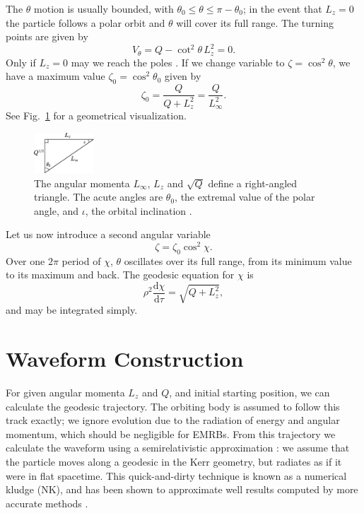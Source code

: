\documentclass[useAMS,usedcolumn,usegraphicx,usenatbib]{mn2e}
\newcommand{\figref}[1]{Fig.~\ref{fig:#1}}
\newcommand{\dd}{\ensuremath{\mathrm{d}}}
\newcommand{\diff}[2]{\ensuremath{\frac{\dd {#1}}{\dd {#2}}}}
\begin{document}
The $\theta$ motion is usually bounded, with $\theta_0 \leq \theta \leq \pi - \theta_0$; in the event that $L_z = 0$ the particle follows a polar orbit and $\theta$ will cover its full range. The turning points are given by
\begin{equation}
V_\theta = Q - \cot^2\theta\, L_z^2 = 0.
\end{equation}
Only if $L_z = 0$ may we reach the poles \citep{Wilkins1972}. If we change variable to $\zeta = \cos^2\theta$, we have a maximum value $\zeta_0 = \cos^2\theta_0$ given by
\begin{equation}
\zeta_0 = \frac{Q}{Q+L_z^2} = \frac{Q}{L_\infty^2}.
\label{eq:theta_0}
\end{equation}
See \figref{L_triangle} for a geometrical visualization.
\begin{figure}
\begin{center}
\includegraphics[width=0.2\textwidth]{Triangle.eps}
    \caption{The angular momenta $L_\infty$, $L_z$ and $\sqrt{Q}$ define a right-angled triangle. The acute angles are $\theta_0$, the extremal value of the polar angle, and $\iota$, the orbital inclination \citep*{Glampedakis2002}.}
   \label{fig:L_triangle}
\end{center}
\end{figure}
Let us now introduce a second angular variable \citep{Drasco2004}
\begin{equation}
\zeta = \zeta_0\cos^2\chi.
\end{equation}
Over one $2\pi$ period of $\chi$, $\theta$ oscillates over its full range, from its minimum value to its maximum and back. The geodesic equation for $\chi$ is
\begin{equation}
\rho^2\diff{\chi}{\tau} = \sqrt{Q + L_z^2},
\end{equation}
and may be integrated simply.

\section{Waveform Construction}\label{sec:Kludge}

For given angular momenta $L_z$ and $Q$, and initial starting position, we can calculate the geodesic trajectory. The orbiting body is assumed to follow this track exactly; we ignore evolution due to the radiation of energy and angular momentum, which should be negligible for EMRBs. From this trajectory we calculate the waveform using a semirelativistic approximation \citep{Ruffini1981}: we assume that the particle moves along a geodesic in the Kerr geometry, but radiates as if it were in flat spacetime. This quick-and-dirty technique is known as a numerical kludge (NK), and has been shown to approximate well results computed by more accurate methods \citep{Babak2007}.
\end{document}
